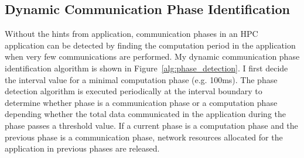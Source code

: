 \begin{comment}
Communications in different phases do not happen at the same time. As such, network
resources (such as communication channels) can be allocated
independently in different phases.
Hence, accurately identifying communication phases can improve
the SDN support for HPC applications. Traditionally SDN schemes such
as the Hedera's threshold-based scheme automatically detect communication
changes when the flow statistics are collected and processed. However,
the granularity of such detection is the same as that for flow statistics
collection and processing, and network reconfiguration,
which is in the order in seconds. Such a coarse granularity is ineffective
for tightly coupled HPC applications whose phases can change in
subseconds or even submilliseconds. 
\end{comment}


\subsection{Dynamic Communication Phase Identification}

\begin{comment}
 Flow information used to
classify elephant flows in current phase should ignore the flow information for the flows in the
previous phase as these two set of flows  don't occur together.
In order to
determine if the network is in a communication phase, the network must be
probed at intervals smaller than the polling interval to check if data is being
sent above a certain threshold. If it is, then the network is in a
communication phase; otherwise, it is mostly in a computation phase.
If the
network transitions from a computation phase to a communication phase or vice versa during
probing, previous flow paths for elephant flows are disregarded, and the flow
informations for each flow in the current phase is considered for
prediction. 
\end{comment}

Without the hints from application, communication phases in an HPC
application can be detected by finding the computation period in the
application when very few communications are performed. 
My dynamic communication phase identification algorithm
is shown in Figure~\ref{alg:phase_detection}. I first decide the interval
value for a minimal computation phase (e.g. 100ms). The phase detection
algorithm is executed periodically at the interval boundary to determine
whether phase is a communication phase or a computation phase depending
whether the total data communicated in the application during the phase
passes a threshold value. If a current phase is a computation phase and
the previous phase is a communication phase, network resources allocated
for the application in previous phases are released. 


